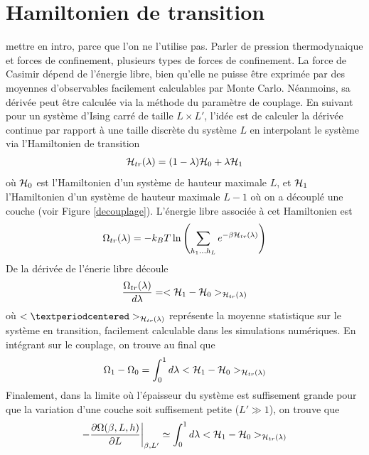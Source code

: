 \section{Hamiltonien de transition}
\label{sec-transition}
{\color{red} mettre en intro, parce que l'on ne l'utilise pas. Parler de pression thermodynaique et forces de confinement, plusieurs types de forces de confinement. }
La force de Casimir dépend  de l'énergie libre, bien qu'elle ne puisse être exprimée par des moyennes d'observables facilement calculables par Monte Carlo. Néanmoins, sa dérivée peut être calculée via la méthode du paramètre de couplage. En suivant \cite{vasilyev_monte_2007,cardozo_finite_2015} pour un système d'Ising carré de taille $L \times L'$, l'idée est de calculer la dérivée continue par rapport à une taille discrète du système $L$ en interpolant le système via l'Hamiltonien de transition
\begin{align}
    \mathcal{H}_{tr}(\lambda) = (1-\lambda) \mathcal{H}_0 + \lambda \mathcal{H}_1
    \label{hamil-trans}
\end{align}
où $\mathcal{H}_0$ est l'Hamiltonien d'un système de hauteur maximale $L$, et $\mathcal{H}_1$ l'Hamiltonien d'un système de hauteur maximale $L-1$ où on a découplé une couche (voir Figure \ref{decouplage}). L'énergie libre associée à cet Hamiltonien est
\begin{align}
    \Omega_{tr}(\lambda) = -k_B T \ln \left( \sum_{h_1 ... h_L} e^{-\beta \mathcal{H}_{tr}(\lambda)} \right)
\end{align}
De la dérivée de l'énerie libre découle
\begin{align}
    \frac{\Omega_{tr}(\lambda)}{d\lambda} = < \mathcal{H}_1 - \mathcal{H}_0>_{\mathcal{H}_{tr}(\lambda)}
\end{align}
où $< · >_{\mH_{tr}(\lambda)}$ représente la moyenne statistique sur le système en transition, facilement calculable dans les simulations numériques. En intégrant sur le couplage, on trouve au final que
\begin{align}
    \Omega_1 - \Omega_0 = \int_0^1 d\lambda  < \mathcal{H}_1 - \mathcal{H}_0>_{\mathcal{H}_{tr}(\lambda)}
\end{align}
Finalement, dans la limite où l'épaisseur du système est suffisement grande pour que la variation d'une couche soit suffisement petite ($L' \gg 1$), on trouve que
\begin{align}
   - \frac{\partial \Omega(\beta,L,h)}{\partial L} \bigg|_{\beta,L'} \simeq  \int_0^1 d\lambda  < \mathcal{H}_1 - \mathcal{H}_0>_{\mathcal{H}_{tr}(\lambda)}
\end{align}

